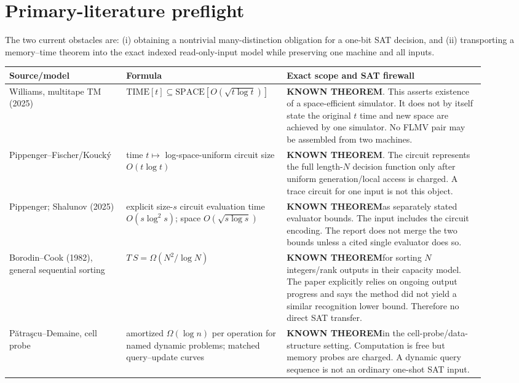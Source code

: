 \documentclass[11pt]{article}
\newcommand{\known}{\textbf{KNOWN THEOREM}}
\begin{document}
\section*{Primary-literature preflight}
The two current obstacles are: (i) obtaining a nontrivial many-distinction obligation
for a one-bit SAT decision, and (ii) transporting a memory--time theorem into the exact
indexed read-only-input model while preserving one machine and all inputs.

\begin{longtable}{p{0.23\linewidth}p{0.28\linewidth}p{0.39\linewidth}}
\toprule
Source/model & Formula & Exact scope and SAT firewall\\
\midrule
Williams, multitape TM (2025) &
$\mathrm{TIME}[t]\subseteq\mathrm{SPACE}[O(\sqrt{t\log t})]$ &
\known.  This asserts existence of a space-efficient simulator.  It does not by
itself state the original $t$ time and new space are achieved by one simulator.
No FLMV pair may be assembled from two machines.\\

Pippenger--Fischer/Kouck\'y &
time $t\mapsto$ log-space-uniform circuit size $O(t\log t)$ &
\known.  The circuit represents the full length-$N$ decision function only after
uniform generation/local access is charged.  A trace circuit for one input is not
this object.\\

Pippenger; Shalunov (2025) &
explicit size-$s$ circuit evaluation time $O(s\log^2s)$; space
$O(\sqrt{s\log s})$ &
\known as separately stated evaluator bounds.  The input includes the circuit
encoding.  The report does not merge the two bounds unless a cited single evaluator
does so.\\

Borodin--Cook (1982), general sequential sorting &
$T\,S=\Omega(N^2/\log N)$ &
\known for sorting $N$ integers/rank outputs in their capacity model.  The paper
explicitly relies on ongoing output progress and says the method did not yield a
similar recognition lower bound.  Therefore no direct SAT transfer.\\

P\u{a}tra\c{s}cu--Demaine, cell probe &
amortized $\Omega(\log n)$ per operation for named dynamic problems; matched
query--update curves &
\known in the cell-probe/data-structure setting.  Computation is free but memory
probes are charged.  A dynamic query sequence is not an ordinary one-shot SAT input.\\


\end{longtable}
\end{document}

